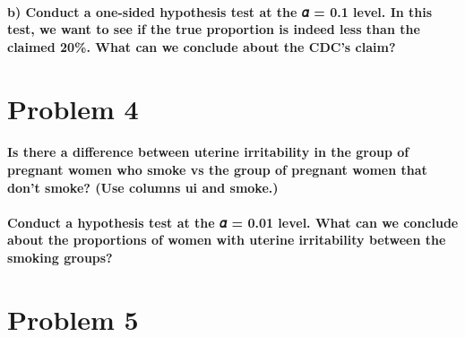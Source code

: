 \documentclass[
]{article}
\begin{document}
\hypertarget{b-conduct-a-one-sided-hypothesis-test-at-the-ux1d6fc-0.1-level.-in-this-test-we-want-to-see-if-the-true-proportion-is-indeed-less-than-the-claimed-20.-what-can-we-conclude-about-the-cdcs-claim}{%
\paragraph{b) Conduct a one-sided hypothesis test at the 𝛼 = 0.1 level.
In this test, we want to see if the true proportion is indeed less than
the claimed 20\%. What can we conclude about the CDC's
claim?}\label{b-conduct-a-one-sided-hypothesis-test-at-the-ux1d6fc-0.1-level.-in-this-test-we-want-to-see-if-the-true-proportion-is-indeed-less-than-the-claimed-20.-what-can-we-conclude-about-the-cdcs-claim}}

\hypertarget{problem-4}{%
\section{Problem 4}\label{problem-4}}

\hypertarget{is-there-a-difference-between-uterine-irritability-in-the-group-of-pregnant-women-who-smoke-vs-the-group-of-pregnant-women-that-dont-smoke-use-columns-ui-and-smoke.}{%
\paragraph{Is there a difference between uterine irritability in the
group of pregnant women who smoke vs the group of pregnant women that
don't smoke? (Use columns ui and
smoke.)}\label{is-there-a-difference-between-uterine-irritability-in-the-group-of-pregnant-women-who-smoke-vs-the-group-of-pregnant-women-that-dont-smoke-use-columns-ui-and-smoke.}}

\hypertarget{conduct-a-hypothesis-test-at-the-ux1d6fc-0.01-level.-what-can-we-conclude-about-the-proportions-of-women-with-uterine-irritability-between-the-smoking-groups}{%
\paragraph{Conduct a hypothesis test at the 𝛼 = 0.01 level. What can we
conclude about the proportions of women with uterine irritability
between the smoking
groups?}\label{conduct-a-hypothesis-test-at-the-ux1d6fc-0.01-level.-what-can-we-conclude-about-the-proportions-of-women-with-uterine-irritability-between-the-smoking-groups}}

\hypertarget{problem-5}{%
\section{Problem 5}\label{problem-5}}
\end{document}

